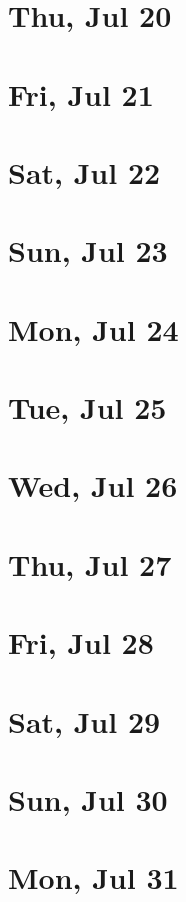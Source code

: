 	\section{Thu, Jul 20}
		
		
	\section{Fri, Jul 21}
		
		
	\section{Sat, Jul 22}
		
		
	\section{Sun, Jul 23}
		
		
	\section{Mon, Jul 24}
		
		
	\section{Tue, Jul 25}
		
		
	\section{Wed, Jul 26}
		
		
	\section{Thu, Jul 27}
		
		
	\section{Fri, Jul 28}
		
		
	\section{Sat, Jul 29}
		
		
	\section{Sun, Jul 30}
		
		
	\section{Mon, Jul 31}
		
		
